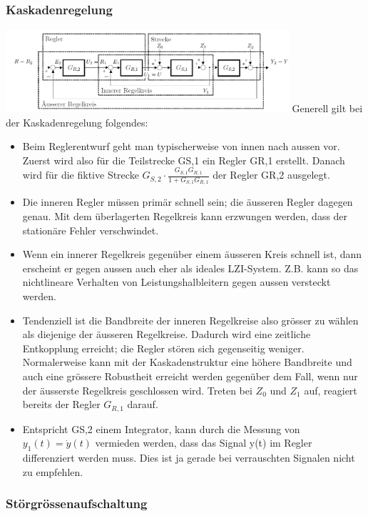 \subsubsection{Kaskadenregelung }
\begin{multicols}{2}
\includegraphics[width=10.5cm]{./images/KaskadenRegelung.png}
Generell gilt bei der Kaskadenregelung folgendes:
\begin{itemize}
\item Beim Reglerentwurf geht man typischerweise von innen nach aussen vor. Zuerst
wird also für die Teilstrecke GS,1 ein Regler GR,1 erstellt. Danach wird für die
fiktive Strecke $G_{S,2} \cdot \frac{G_{S,1}G_{R,1}}{1+G_{S,1}G_{R,1}}$
der Regler GR,2 ausgelegt.
\item Die inneren Regler müssen primär schnell sein; die äusseren Regler dagegen
genau. Mit dem überlagerten Regelkreis kann erzwungen werden, dass der stationäre Fehler verschwindet.
\item Wenn ein innerer Regelkreis gegenüber einem äusseren Kreis schnell ist, dann
erscheint er gegen aussen auch eher als ideales LZI-System. Z.B. kann so das
nichtlineare Verhalten von Leistungshalbleitern gegen aussen versteckt werden.
\item Tendenziell ist die Bandbreite der inneren Regelkreise also grösser zu wählen
als diejenige der äusseren Regelkreise. Dadurch wird eine zeitliche Entkopplung
erreicht; die Regler stören sich gegenseitig weniger.
Normalerweise kann mit der Kaskadenstruktur eine höhere Bandbreite und
auch eine grössere Robustheit erreicht werden gegenüber dem Fall, wenn nur
der äusserste Regelkreis geschlossen wird.
Treten bei $Z_0$ und $Z_1$ auf, reagiert bereits der Regler
$G_{R,1}$ darauf.
\item Entspricht  GS,2 einem Integrator, kann durch die
Messung von $y_1(t) = \dot{y}(t)$ vermieden werden, dass das Signal y(t) im Regler
differenziert werden muss. Dies ist ja gerade bei verrauschten Signalen nicht
zu empfehlen.
\end{itemize}
\end{multicols}

\subsubsection{Störgrössenaufschaltung }


